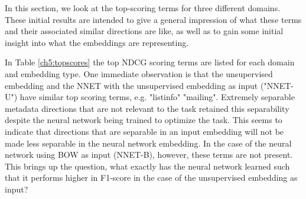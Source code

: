 In this section, we look at the top-scoring terms for three different domains. These initial results are intended to give a general impression of what these terms and their associated similar directions are like, as well as to gain some initial insight into what the embeddings are representing.

In Table \ref{ch5:topscores} the top NDCG scoring terms are listed for each domain and embedding type. One immediate observation is that the unsupervised embedding and the NNET with the unsupervised embedding as input ("NNET-U") have similar top scoring terms, e.g. "listinfo" "mailing". Extremely separable metadata directions that are not relevant to the task retained this separability despite the neural network being trained to optimize the task. This seems to indicate that directions that are separable in an input embedding will not be made less separable in the neural network embedding. In the case of the neural network using BOW as input (NNET-B), however, these  terms are not present. This brings up the question, what exactly has the neural network learned such that it performs higher in F1-score in the case of the unsupervised embedding as input? 


